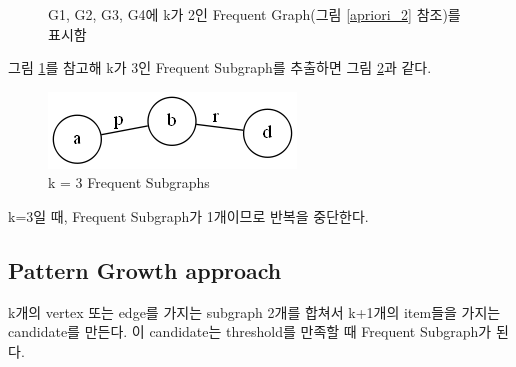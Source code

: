 \documentclass{oblivoir}
\begin{document}
		\begin{figure}[h]
			\centering
			\quad 
			\quad
			\quad 
			\caption{G1, G2, G3, G4에 k가 2인 Frequent Graph(그림 \ref{apriori_2} 참조)를 표시함}
			\label{ex} 
		\end{figure}
		
		그림 \ref{ex}를 참고해 k가 3인 Frequent Subgraph를 추출하면 그림 \ref{apriori_3}과 같다.

		
		\begin{figure}[h]
			\centering
			\includegraphics[width=.3\linewidth]{figure/apriori.11}
			\caption{k = 3 Frequent Subgraphs}
			\label{apriori_3}
		\end{figure}
		
		k=3일 때, Frequent Subgraph가 1개이므로 반복을 중단한다.
		
		

		\subsection{Pattern Growth approach}
			k개의 vertex 또는 edge를 가지는 subgraph 2개를 합쳐서 k+1개의 item들을 가지는 candidate를 만든다. 이 candidate는 threshold를 만족할 때 Frequent Subgraph가 된다.
			
\end{document}
